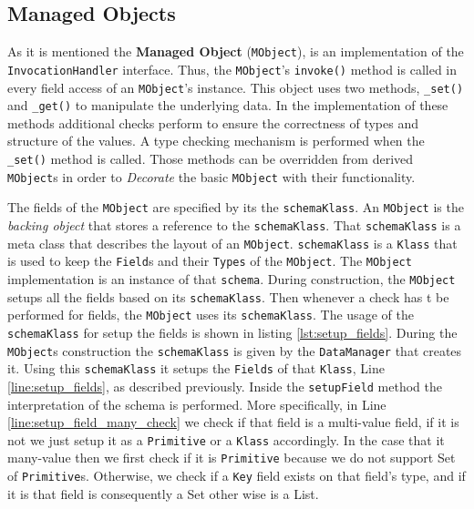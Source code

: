 \subsection{Managed Objects}\label{sec:Managed Objects}
As it is mentioned the \textbf{Managed Object} (\texttt{MObject}), is an implementation of the \texttt{InvocationHandler} interface.
Thus, the \texttt{MObject}'s \texttt{invoke()} method is called in every field access of an \texttt{MObject}'s instance.
This object uses two methods, \texttt{\_set()} and \texttt{\_get()} to manipulate the underlying data.
In the implementation of these methods additional checks perform to ensure the correctness of types and structure of the values.
A type checking mechanism is performed when the \texttt{\_set()} method is called. 
Those methods can be overridden from derived \texttt{MObject}s in order to \textit{Decorate} the basic \texttt{MObject} with their functionality.

The fields of the \texttt{MObject} are specified by its the \texttt{schemaKlass}.
An \texttt{MObject} is the \textit{backing object} that stores a reference to the \texttt{schemaKlass}.
That \texttt{schemaKlass} is a meta class that describes the layout of an \texttt{MObject}. 
\texttt{schemaKlass} is a \texttt{Klass} that is used to keep the \texttt{Field}s and their \texttt{Types} of the \texttt{MObject}.
The \texttt{MObject} implementation is an instance of that \texttt{schema}.
During construction, the \texttt{MObject} setups all the fields based on its \texttt{schemaKlass}.
Then whenever a check has t be performed for fields, the \texttt{MObject} uses its \texttt{schemaKlass}.
The usage of the \texttt{schemaKlass} for setup the fields is shown in listing \ref{lst:setup_fields}.
During the \texttt{MObject}s construction the \texttt{schemaKlass} is given by the \texttt{DataManager} that creates it.
Using this \texttt{schemaKlass} it setups the \texttt{Fields} of that \texttt{Klass}, Line \ref{line:setup_fields}, as described previously.
Inside the \texttt{setupField} method the interpretation of the schema is performed.
More specifically, in Line \ref{line:setup_field_many_check} we check if that field is a multi-value field, if it is not we just setup it as a \texttt{Primitive} or a \texttt{Klass} accordingly. 
In the case that it many-value then we first check if it is \texttt{Primitive} because we do not support Set of \texttt{Primitive}s.
Otherwise, we check if a \texttt{Key} field exists on that field's type, and if it is that field is consequently a Set other wise is a List.


